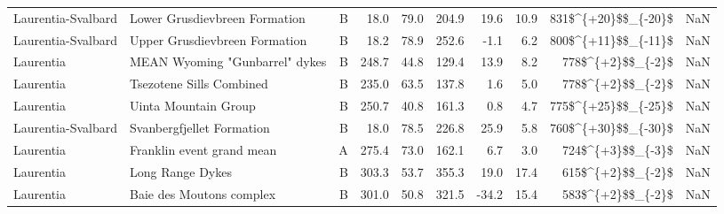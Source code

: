 \begin{longtable}{p{1 in}p{1 in}rrrrrrr}
            Laurentia-Svalbard &                      Lower Grusdievbreen Formation &      B &      18.0 &      79.0 & 204.9 &  19.6 &      10.9 &    831\$\textasciicircum \{+20\}\$\$\_\{-20\}\$ &                                                NaN \\
            Laurentia-Svalbard &                      Upper Grusdievbreen Formation &      B &      18.2 &      78.9 & 252.6 &  -1.1 &       6.2 &    800\$\textasciicircum \{+11\}\$\$\_\{-11\}\$ &                                                NaN \\
                     Laurentia &                     MEAN Wyoming "Gunbarrel" dykes &      B &     248.7 &      44.8 & 129.4 &  13.9 &       8.2 &      778\$\textasciicircum \{+2\}\$\$\_\{-2\}\$ &                                                NaN \\
                     Laurentia &                           Tsezotene Sills Combined &      B &     235.0 &      63.5 & 137.8 &   1.6 &       5.0 &      778\$\textasciicircum \{+2\}\$\$\_\{-2\}\$ &                                                NaN \\
                     Laurentia &                               Uinta Mountain Group &      B &     250.7 &      40.8 & 161.3 &   0.8 &       4.7 &    775\$\textasciicircum \{+25\}\$\$\_\{-25\}\$ &                                                NaN \\
            Laurentia-Svalbard &                          Svanbergfjellet Formation &      B &      18.0 &      78.5 & 226.8 &  25.9 &       5.8 &    760\$\textasciicircum \{+30\}\$\$\_\{-30\}\$ &                                                NaN \\
                     Laurentia &                          Franklin event grand mean &      A &     275.4 &      73.0 & 162.1 &   6.7 &       3.0 &      724\$\textasciicircum \{+3\}\$\$\_\{-3\}\$ &                                                NaN \\
                     Laurentia &                                   Long Range Dykes &      B &     303.3 &      53.7 & 355.3 &  19.0 &      17.4 &      615\$\textasciicircum \{+2\}\$\$\_\{-2\}\$ &                                                NaN \\
                     Laurentia &                           Baie des Moutons complex &      B &     301.0 &      50.8 & 321.5 & -34.2 &      15.4 &      583\$\textasciicircum \{+2\}\$\$\_\{-2\}\$ &                                                NaN \\

\end{longtable}
